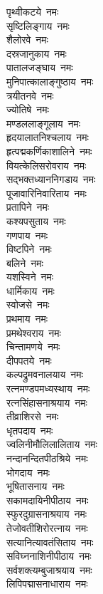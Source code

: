 \begin{multicols}{2}
\begin{flushleft}
पृथ्वीकटये~नमः\\
सृष्टिलिङ्गाय~नमः\\
शैलोरवे~नमः\\
दस्रजानुकाय~नमः\\
पातालजङ्घाय~नमः\\
मुनिपात्कालाङ्गुष्ठाय~नमः\\
त्रयीतनवे~नमः\\
ज्योतिषे~नमः\\
मण्डललाङ्गूलाय~नमः\hfill{}\\
हृदयालातनिश्चलाय~नमः\\
हृत्पद्मकर्णिकाशालिने~नमः\\
वियत्केलिसरोवराय~नमः\\
सद्भक्तध्याननिगडाय~नमः\\
पूजावारिनिवारिताय~नमः\\
प्रतापिने~नमः\\
कश्यपसुताय~नमः\\
गणपाय~नमः\\
विष्टपिने~नमः\\
बलिने~नमः\hfill{}\\
यशस्विने~नमः\\
धार्मिकाय~नमः\\
स्वोजसे~नमः\\
प्रथमाय~नमः\\
प्रमथेश्वराय~नमः\\
चिन्तामणये~नमः\\
दीपपतये~नमः\\
कल्पद्रुमवनालयाय~नमः\\
रत्नमण्डपमध्यस्थाय~नमः\\
रत्नसिंहासनाश्रयाय~नमः\hfill{}\\
तीव्राशिरसे~नमः\\
धृतपदाय~नमः\\
ज्वलिनीमौलिलालिताय~नमः\\
नन्दानन्दितपीठश्रिये~नमः\\
भोगदाय~नमः\\
भूषितासनाय~नमः\\
सकामदायिनीपीठाय~नमः\\
स्फुरदुग्रासनाश्रयाय~नमः\\
तेजोवतीशिरोरत्नाय~नमः\\
सत्यानित्यावतंसिताय~नमः\hfill{}\\
सविघ्ननाशिनीपीठाय~नमः\\
सर्वशक्त्यम्बुजाश्रयाय~नमः\\
लिपिपद्मासनाधाराय~नमः\\

\end{flushleft}
\end{multicols}
